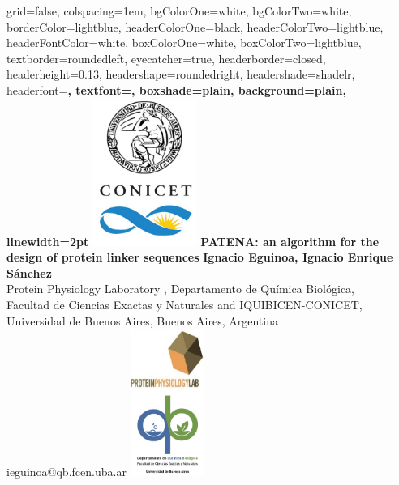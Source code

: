 \documentclass[portrait,final,paperwidth=90cm,paperheight=130cm,fontscale=0.295]{baposter}
\begin{document}
\begin{poster}%
  {
  grid=false,
  colspacing=1em,
  bgColorOne=white,
  bgColorTwo=white,
  borderColor=lightblue,
  headerColorOne=black,
  headerColorTwo=lightblue,
  headerFontColor=white,
  boxColorOne=white,
  boxColorTwo=lightblue,
  textborder=roundedleft,
  eyecatcher=true,
  headerborder=closed,
  headerheight=0.13\textheight,
  headershape=roundedright,
  headershade=shadelr,
  headerfont=\Large\bf\textsc, %
  textfont={\setlength{\parindent}{1.5em}},
  boxshade=plain,
  background=plain,
  linewidth=2pt
  }
  {
   \hspace{10px}
  \includegraphics[height=13em]{figures/logos.png} 
} 
  {\bf{PATENA: an algorithm for the \\design of protein linker sequences}}
  {\normalsize{\textbf{Ignacio Eguinoa, Ignacio Enrique S\'anchez} \\
Protein Physiology Laboratory , Departamento de Qu\'imica Biol\'ogica, \\Facultad de Ciencias Exactas y Naturales
and IQUIBICEN-CONICET, \\Universidad de Buenos Aires, Buenos Aires, Argentina\\
ieguinoa@qb.fcen.uba.ar}}
  {%
    \includegraphics[height=13em]{figures/logosDos.png}
    \hspace{10px}
  }


\end{poster}
\end{document}
